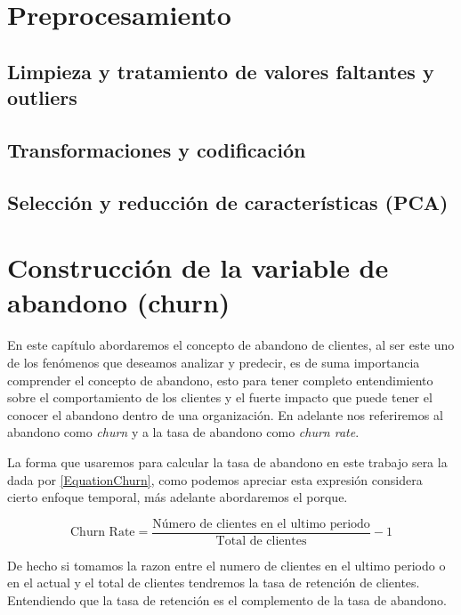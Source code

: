 \section{Preprocesamiento}

\subsection{Limpieza y tratamiento de valores faltantes y outliers}

\subsection{Transformaciones y codificación}

\subsection{Selección y reducción de características (PCA)}

\section{Construcción de la variable de abandono (churn)}

En este capítulo abordaremos el concepto de abandono de clientes, al ser este uno de los fenómenos que deseamos analizar y predecir, es de suma importancia comprender el concepto de abandono, esto para tener completo entendimiento sobre el comportamiento de los clientes y el fuerte impacto que puede tener el conocer el abandono dentro de una organización. En adelante nos referiremos al abandono como \textit{churn} y a la tasa de abandono como \textit{churn rate}.

La forma que usaremos para calcular la tasa de abandono en este trabajo sera la dada por \ref{EquationChurn}, como podemos apreciar esta expresión considera cierto enfoque temporal, más adelante abordaremos el porque.

\begin{equation}
	\textrm{Churn Rate}=\frac{\textrm{Número de clientes en el ultimo periodo}}{\textrm{Total de clientes}} -1 
	\label{EquationChurn}
\end{equation}

De hecho si tomamos la razon entre el numero de clientes en el ultimo periodo o en el actual y el total de clientes tendremos la tasa de retención de clientes. Entendiendo que la tasa de retención es el complemento de la tasa de abandono.
 




